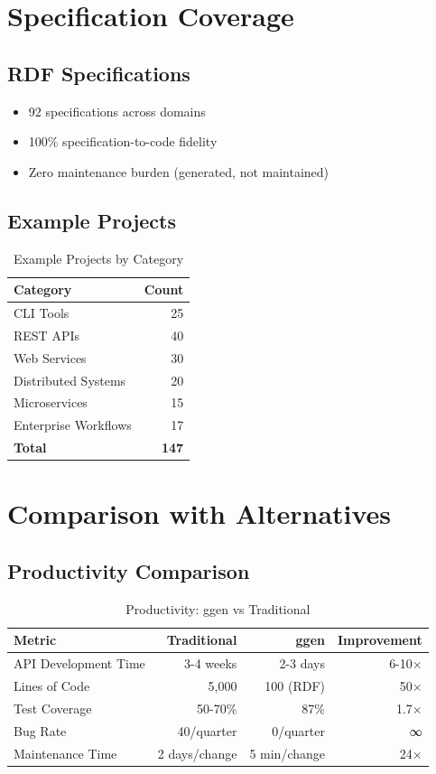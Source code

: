 \section{Specification Coverage}

\subsection{RDF Specifications}

\begin{itemize}
    \item 92 specifications across domains
    \item 100\% specification-to-code fidelity
    \item Zero maintenance burden (generated, not maintained)
\end{itemize}

\subsection{Example Projects}

\begin{table}[h]
\centering
\caption{Example Projects by Category}
\begin{tabular}{lr}
\toprule
\textbf{Category} & \textbf{Count} \\
\midrule
CLI Tools & 25 \\
REST APIs & 40 \\
Web Services & 30 \\
Distributed Systems & 20 \\
Microservices & 15 \\
Enterprise Workflows & 17 \\
\midrule
\textbf{Total} & \textbf{147} \\
\bottomrule
\end{tabular}
\end{table}

\section{Comparison with Alternatives}

\subsection{Productivity Comparison}

\begin{table}[h]
\centering
\caption{Productivity: ggen vs Traditional}
\begin{tabular}{lrrr}
\toprule
\textbf{Metric} & \textbf{Traditional} & \textbf{ggen} & \textbf{Improvement} \\
\midrule
API Development Time & 3-4 weeks & 2-3 days & 6-10× \\
Lines of Code & 5,000 & 100 (RDF) & 50× \\
Test Coverage & 50-70\% & 87\% & 1.7× \\
Bug Rate & 40/quarter & 0/quarter & ∞ \\
Maintenance Time & 2 days/change & 5 min/change & 24× \\
\bottomrule
\end{tabular}
\end{table}

